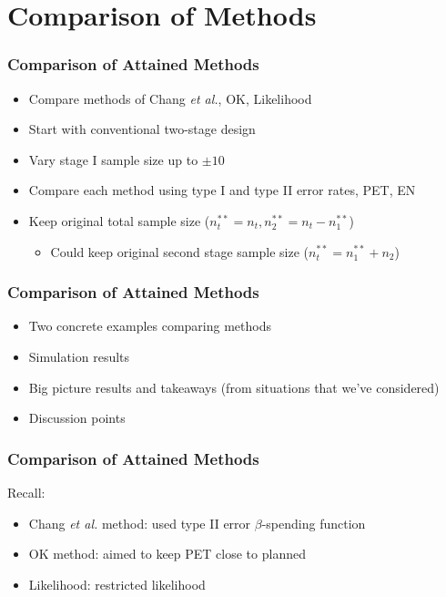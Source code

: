 \documentclass{beamer}\usepackage[]{graphicx}\usepackage[]{color}
\begin{document}
\section{Comparison of Methods}
\begin{frame}
\frametitle{Comparison of Attained Methods}
    \begin{itemize}
        \item Compare methods of Chang \textit{et al.}, OK, Likelihood
        \item Start with conventional two-stage design
        \item Vary stage I sample size up to $\pm 10$
        \item Compare each method using type I and type II error rates, PET, EN 
        \item Keep original total sample size ($n_t^{\ast\ast}=n_t, n_2^{\ast\ast}=n_t-n_1^{\ast\ast}$)
        \begin{itemize}
           \item Could keep original second stage sample size ($n_t^{\ast\ast} = n_1^{\ast\ast} + n_2$)
        \end{itemize}
    \end{itemize}
\end{frame}

\begin{frame}
\frametitle{Comparison of Attained Methods}
    \begin{itemize}
      \item Two concrete examples comparing methods
      \item Simulation results
      \item Big picture results and takeaways (from situations that we've considered)
      \item Discussion points
    \end{itemize}
\end{frame} %

\begin{frame}
\frametitle{Comparison of Attained Methods}
Recall:
  \begin{itemize}
    \item Chang \textit{et al.} method: used type II error $\beta$-spending function 
    \item OK method: aimed to keep PET close to planned
    \item Likelihood: restricted likelihood
  \end{itemize}
\end{frame}
\end{document}
